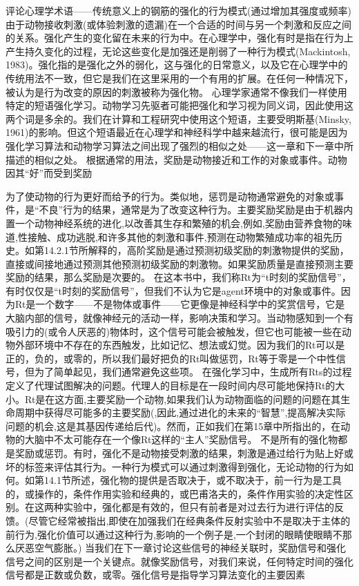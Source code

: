 评论心理学术语——传统意义上的钢筋的强化的行为模式(通过增加其强度或频率)由于动物接收刺激(或体验刺激的遗漏)在一个合适的时间与另一个刺激和反应之间的关系。强化产生的变化留在未来的行为中。在心理学中，强化有时是指在行为上产生持久变化的过程，无论这些变化是加强还是削弱了一种行为模式(Mackintosh, 1983)。强化指的是强化之外的弱化，这与强化的日常意义，以及它在心理学中的传统用法不一致，但它是我们在这里采用的一个有用的扩展。在任何一种情况下，被认为是行为改变的原因的刺激被称为强化物。
心理学家通常不像我们一样使用特定的短语强化学习。动物学习先驱者可能把强化和学习视为同义词，因此使用这两个词是多余的。我们在计算和工程研究中使用这个短语，主要受明斯基(Minsky, 1961)的影响。但这个短语最近在心理学和神经科学中越来越流行，很可能是因为强化学习算法和动物学习算法之间出现了强烈的相似之处——这一章和下一章中所描述的相似之处。
根据通常的用法，奖励是动物接近和工作的对象或事件。动物因其“好”而受到奖励

为了使动物的行为更好而给予的行为。类似地，惩罚是动物通常避免的对象或事件，是“不良”行为的结果，通常是为了改变这种行为。主要奖励奖励是由于机器内置一个动物神经系统的进化,以改善其生存和繁殖的机会,例如,奖励由营养食物的味道,性接触、成功逃脱,和许多其他的刺激和事件,预测在动物繁殖成功率的祖先历史。如第14.2.1节所解释的，高阶奖励是通过预测初级奖励的刺激物提供的奖励，直接或间接地通过预测其他预测初级奖励的刺激物。如果奖励质量是直接预测主要奖励的结果，那么奖励是次要的。
在这本书中，我们称Rt为“t时刻的奖励信号”，有时仅仅是“t时刻的奖励信号”，但我们不认为它是agent环境中的对象或事件。因为Rt是一个数字——不是物体或事件——它更像是神经科学中的奖赏信号，它是大脑内部的信号，就像神经元的活动一样，影响决策和学习。当动物感知到一个有吸引力的(或令人厌恶的)物体时，这个信号可能会被触发，但它也可能被一些在动物外部环境中不存在的东西触发，比如记忆、想法或幻觉。因为我们的Rt可以是正的，负的，或零的，所以我们最好把负的Rt叫做惩罚，Rt等于零是一个中性信号，但为了简单起见，我们通常避免这些项。
在强化学习中，生成所有Rts的过程定义了代理试图解决的问题。代理人的目标是在一段时间内尽可能地保持Rt的大小。Rt是在这方面,主要奖励一个动物,如果我们认为动物面临的问题的问题在其生命周期中获得尽可能多的主要奖励(,因此,通过进化的未来的“智慧”,提高解决实际问题的机会,这是其基因传递给后代)。然而，正如我们在第15章中所指出的，在动物的大脑中不太可能存在一个像Rt这样的“主人”奖励信号。
不是所有的强化物都是奖励或惩罚。有时，强化不是动物接受刺激的结果，刺激是通过给行为贴上好或坏的标签来评估其行为。一种行为模式可以通过刺激得到强化，无论动物的行为如何。如第14.1节所述，强化物的提供是否取决于，或不取决于，前一行为是工具的，或操作的，条件作用实验和经典的，或巴甫洛夫的，条件作用实验的决定性区别。在这两种实验中，强化都是有效的，但只有前者是对过去行为进行评估的反馈。(尽管它经常被指出,即使在加强我们在经典条件反射实验中不是取决于主体的前行为,强化价值可以通过这种行为,影响的一个例子是,一个封闭的眼睛使眼睛不那么厌恶空气膨胀。)
当我们在下一章讨论这些信号的神经关联时，奖励信号和强化信号之间的区别是一个关键点。就像奖励信号，对我们来说，任何特定时间的强化信号都是正数或负数，或零。强化信号是指导学习算法变化的主要因素

